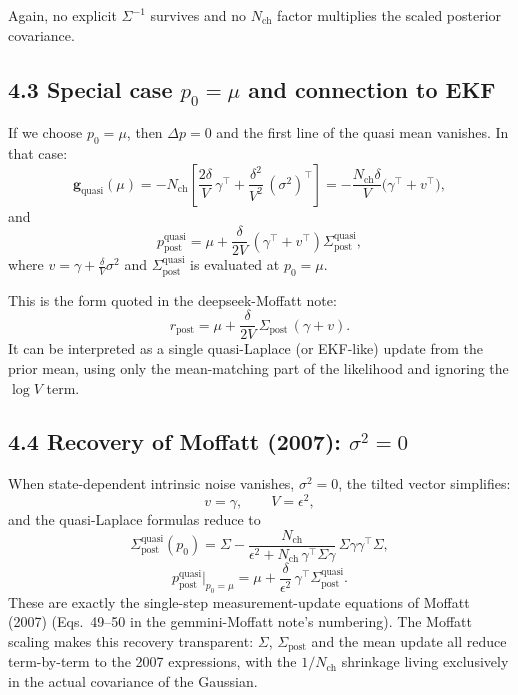 \documentclass[11pt]{article}
\begin{document}
Again, no explicit $\Sigma^{-1}$ survives and no $N_{\text{ch}}$ factor
multiplies the scaled posterior covariance.

\subsection*{4.3 Special case $p_0 = \mu$ and connection to EKF}

If we choose $p_0 = \mu$, then $\Delta p = 0$ and the first line of
the quasi mean vanishes.  In that case:
\[
  \mathbf{g}_{\text{quasi}}(\mu)
  =
  -N_{\text{ch}}
  \left[
    \frac{2\delta}{V}\,\gamma^\top
    + \frac{\delta^2}{V^2}\,(\sigma^2)^\top
  \right]
  =
  -\frac{N_{\text{ch}}\delta}{V}\bigl(\gamma^\top + v^\top\bigr),
\]
and
\[
  p_{\text{post}}^{\text{quasi}}
  =
  \mu + \frac{\delta}{2V}\,(\gamma^\top + v^\top)
        \Sigma_{\text{post}}^{\text{quasi}},
\]
where $v = \gamma + \frac{\delta}{V}\sigma^2$ and
$\Sigma_{\text{post}}^{\text{quasi}}$ is evaluated at $p_0 = \mu$.

This is the form quoted in the deepseek-Moffatt note:
\[
  r_{\text{post}}
  =
  \mu
  + \frac{\delta}{2V}\,\Sigma_{\text{post}}\,(\gamma + v).
\]
It can be interpreted as a single quasi-Laplace (or EKF-like) update
from the prior mean, using only the mean-matching part of the
likelihood and ignoring the $\log V$ term.

\subsection*{4.4 Recovery of Moffatt (2007): $\sigma^2 = 0$}

When state-dependent intrinsic noise vanishes, $\sigma^2 = 0$,
the tilted vector simplifies:
\[
  v = \gamma,
  \qquad
  V = \epsilon^2,
\]
and the quasi-Laplace formulas reduce to
\[
  \Sigma_{\text{post}}^{\text{quasi}}(p_0)
  =
  \Sigma
  - \frac{N_{\text{ch}}}{\epsilon^2 + N_{\text{ch}}\,\gamma^\top\Sigma\gamma}\,
    \Sigma\gamma\gamma^\top\Sigma,
\]
\[
  p_{\text{post}}^{\text{quasi}}\big|_{p_0=\mu}
  =
  \mu
  + \frac{\delta}{\epsilon^2}\,\gamma^\top\Sigma_{\text{post}}^{\text{quasi}}.
\]
These are exactly the single-step measurement-update equations of
Moffatt (2007) (Eqs.~49--50 in the gemmini-Moffatt note's numbering).
The Moffatt scaling makes this recovery transparent: $\Sigma$,
$\Sigma_{\text{post}}$ and the mean update all reduce term-by-term to
the 2007 expressions, with the $1/N_{\text{ch}}$ shrinkage living
exclusively in the actual covariance of the Gaussian.
\end{document}

